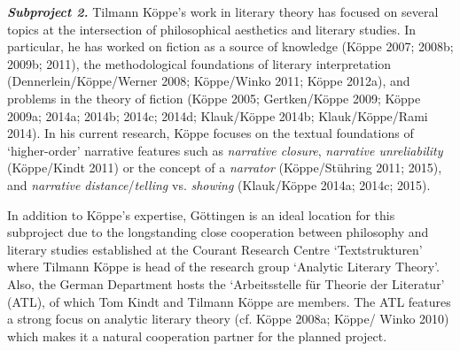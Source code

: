 \vspace{.2cm}
\noindent \textbf{\emph{Subproject 2.}} Tilmann K\"oppe's work in literary theory has focused on several topics at the intersection of philosophical aesthetics and literary studies. In particular, he has worked on fiction as a source of knowledge (K\"oppe 2007; 2008b; 2009b; 2011), the methodological foundations of literary interpretation (Dennerlein/K\"oppe/Werner 2008; K\"oppe/Winko 2011; K\"oppe 2012a), and problems in the theory of fiction (K\"oppe 2005; Gertken/K\"oppe 2009; K\"oppe 2009a; 2014a; 2014b; 2014c; 2014d; Klauk/K\"oppe 2014b; Klauk/K\"oppe/Rami 2014). In his current research, K\"oppe focuses on the textual foundations of `higher-order' narrative features such as \emph{narrative closure}, \emph{narrative unreliability} (K\"oppe/Kindt 2011) or the concept of a \emph{narrator} (K\"oppe/St\"uhring 2011; 2015), and \emph{narrative distance}/\emph{telling} vs. \emph{showing} (Klauk/K\"oppe 2014a; 2014c; 2015). 

In addition to K\"oppe's expertise, G\"ottingen is an ideal location for this subproject due to the longstanding close cooperation between philosophy and literary studies established at the Courant Research Centre `Textstrukturen' where Tilmann K\"oppe is head of the research group `Analytic Literary Theory'. Also, the German Department hosts the `Arbeitsstelle f\"ur Theorie der Literatur' (ATL), of which Tom Kindt and Tilmann K\"oppe are members. The ATL features a strong focus on analytic literary theory (cf. K\"oppe 2008a; K\"oppe/ Winko 2010) which makes it a natural cooperation partner for the planned project.


